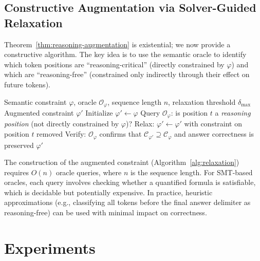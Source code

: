\documentclass[twoside,11pt]{article}
\newcommand{\Oracle}{\mathcal{O}}
\newcommand{\Constraint}{\mathcal{C}}
\begin{document}
\subsection{Constructive Augmentation via Solver-Guided Relaxation}
\label{sec:constructive-augmentation}

Theorem~\ref{thm:reasoning-augmentation} is existential; we now provide a
constructive algorithm. The key idea is to use the semantic oracle to
identify which token positions are ``reasoning-critical'' (directly
constrained by $\varphi$) and which are ``reasoning-free'' (constrained only
indirectly through their effect on future tokens).

\begin{algorithm}[t]
\caption{Solver-Guided Constraint Relaxation}
\label{alg:relaxation}
\begin{algorithmic}[1]
\REQUIRE Semantic constraint $\varphi$, oracle $\Oracle_\varphi$, sequence
length $n$, relaxation threshold $\delta_{\max}$
\ENSURE Augmented constraint $\varphi'$
\STATE Initialize $\varphi' \leftarrow \varphi$
    \STATE Query $\Oracle_\varphi$: is position $t$ a \emph{reasoning
    position} (not directly constrained by $\varphi$)?
        \STATE Relax: $\varphi' \leftarrow \varphi'$ with constraint on
        position $t$ removed
    \ENDIF
\ENDFOR
\STATE Verify: $\Oracle_\varphi$ confirms that $\Constraint_{\varphi'}
\supseteq \Constraint_\varphi$ and answer correctness is preserved
\RETURN $\varphi'$
\end{algorithmic}
\end{algorithm}

The construction of the augmented constraint
(Algorithm~\ref{alg:relaxation}) requires $O(n)$ oracle queries, where $n$
is the sequence length. For SMT-based oracles, each query involves checking
whether a quantified formula is satisfiable, which is decidable but
potentially expensive. In practice, heuristic approximations (e.g.,
classifying all tokens before the final answer delimiter as reasoning-free)
can be used with minimal impact on correctness.

\section{Experiments}
\label{sec:experiments}
\end{document}
